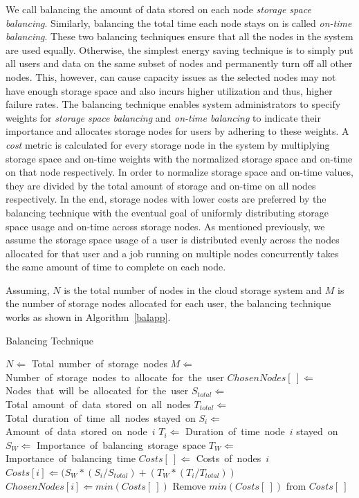 We call balancing the amount of data stored on each node \textit{storage space balancing}.
Similarly, balancing the total time each node stays on is
called \textit{on-time balancing}. These two balancing
techniques ensure that all the nodes in the system are used equally.
Otherwise, the simplest energy saving technique is to simply put all
users and data on the same subset of nodes and permanently turn off
all other nodes. This, however, can cause capacity issues as the
selected nodes may not have enough storage space and also incurs
higher utilization and thus, higher failure rates.
The balancing technique enables system administrators to specify weights for \textit{storage space
balancing} and \textit{on-time balancing} to indicate their importance and allocates
storage nodes for users by adhering to these weights. A \textit{cost} metric is calculated for every
storage node in the system by multiplying storage space and on-time weights with the normalized 
storage space and on-time on that node respectively. In order to normalize storage space and
on-time values, they are divided by the total amount of storage and on-time on all nodes
respectively. In the end, storage nodes with lower costs are preferred by the balancing technique
with the eventual goal of uniformly distributing storage space usage and on-time across storage nodes.
As mentioned previously, we assume the storage space usage of a user is distributed evenly across the
nodes allocated for that user and a job running on multiple nodes concurrently takes the same amount
of time to complete on each node.

Assuming, $N$ is the total number of nodes in the cloud storage system and $M$ is the number
of storage nodes allocated for each user, the balancing technique works as shown in Algorithm~\ref{balapp}.

\begin{algorithm}[!htbp]
\caption{Balancing Technique}
\label{balapp}
\begin{algorithmic}[1]
    \STATE $N \Leftarrow$ Total\ number\ of\ storage\ nodes
    \STATE $M \Leftarrow$ Number\ of\ storage\ nodes\ to\ allocate\ for\ the\ user
    \STATE $ChosenNodes[\ ] \Leftarrow$ Nodes\ that\ will\ be\ allocated\ for\ the\ user
    \STATE $S_{total} \Leftarrow$ Total\ amount\ of\ data\ stored\ on\ all\ nodes
    \STATE $T_{total} \Leftarrow$ Total\ duration\ of\ time\ all\ nodes\ stayed\ on
    \STATE $S_i \Leftarrow$ Amount\ of\ data\ stored\ on\ node\ $i$
    \STATE $T_i \Leftarrow$ Duration\ of\ time\ node\ $i$ stayed\ on
    \STATE $S_W \Leftarrow$ Importance\ of\ balancing\ storage\ space
    \STATE $T_W \Leftarrow$ Importance\ of\ balancing\ time
    \STATE $Costs[\ ] \Leftarrow$ Costs\ of\ nodes\ $i$
        \STATE $Costs[i] \Leftarrow (S_W * (S_i/S_{total}) + (T_W * (T_i/T_{total}))$
    \ENDFOR
        \STATE $ChosenNodes[i] \Leftarrow min(Costs[\ ])$
        \STATE Remove $min(Costs[\ ])$ from $Costs[\ ]$
    \ENDFOR
\end{algorithmic}
\end{algorithm}

